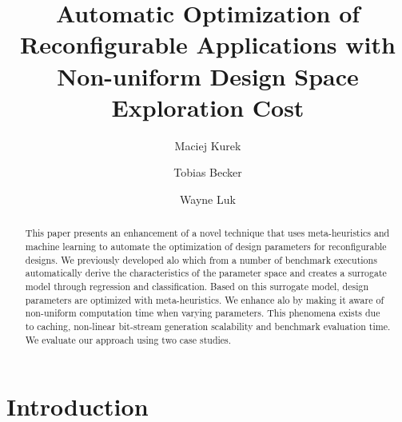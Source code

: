 \documentclass[10pt,conference,a4paper]{IEEEtran}
\begin{document}

\title{Automatic Optimization of Reconfigurable Applications with Non-uniform Design Space Exploration Cost}


%
%
\author{Maciej Kurek \and Tobias Becker \and Wayne Luk}
%


\maketitle


\begin{abstract}

This paper presents an enhancement of a novel technique that uses meta-heuristics and machine learning to automate the optimization of design parameters for reconfigurable designs. We previously developed \ac{alo} which from a number of benchmark executions automatically derive the characteristics of the parameter space and creates a surrogate model through regression and classification. Based on this surrogate model, design parameters are optimized with meta-heuristics. We enhance \ac{alo} by making it aware of non-uniform computation time when varying parameters. This phenomena exists due to caching, non-linear bit-stream generation scalability and benchmark evaluation time. We evaluate our approach using two case studies.


\end{abstract}

\section{Introduction}
\end{document}
